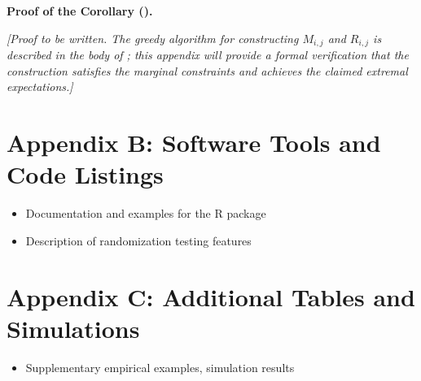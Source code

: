 \documentclass[
  12pt,
]{article}
\providecommand{\tightlist}{%
  \setlength{\itemsep}{0pt}\setlength{\parskip}{0pt}}
\theoremstyle{plain}
\theoremstyle{definition}
\theoremstyle{remark}
\begin{document}
\textbf{Proof of the Corollary (\textcite{corr-min}).}

\emph{{[}Proof to be written. The greedy algorithm for constructing
\(M_{i,j}\) and \(R_{i,j}\) is described in the body of
; this appendix will provide a formal
verification that the construction satisfies the marginal constraints
and achieves the claimed extremal expectations.{]}}

\section{Appendix B: Software Tools and Code
Listings}\label{appendix-b-software-tools-and-code-listings}

\begin{itemize}
\tightlist
\item
  Documentation and examples for the R package\\
\item
  Description of randomization testing features
\end{itemize}

\section{Appendix C: Additional Tables and
Simulations}\label{appendix-c-additional-tables-and-simulations}

\begin{itemize}
\tightlist
\item
  Supplementary empirical examples, simulation results
\end{itemize}
\end{document}

